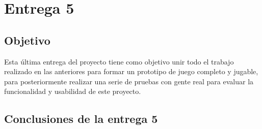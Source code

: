 \section{Entrega 5}


\subsection{Objetivo}

Esta última entrega del proyecto tiene como objetivo unir todo el trabajo realizado en las anteriores para formar un prototipo de juego completo y jugable, para posteriormente realizar una serie de pruebas con gente real para evaluar la funcionalidad y usabilidad de este proyecto.











\subsection{Conclusiones de la entrega 5}




